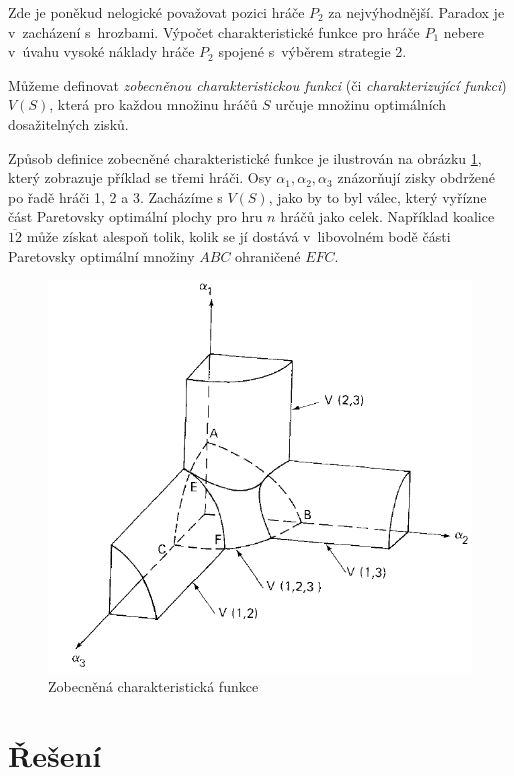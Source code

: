 \documentclass[a5paper,12pt]{article}
\begin{document}
    Zde je poněkud nelogické považovat pozici  hráče $P_2$ za nejvýhodnější. Paradox je v~zacházení s~hrozbami. Výpočet charakteristické funkce pro hráče $P_1$ nebere v~úvahu vysoké náklady hráče $P_2$ spojené s~výběrem strategie 2.

    Můžeme definovat \emph{zobecněnou charakteristickou funkci} (či \emph{charakterizující funkci}) $V(S)$, která pro každou množinu hráčů $S$ určuje množinu optimálních dosažitelných zisků.

    Způsob definice zobecněné charakteristické funkce je ilustrován na obrázku \ref{charfce}, který zobrazuje příklad se třemi hráči. Osy $\alpha_1,\alpha_2,\alpha_3$ znázorňují zisky obdržené po řadě hráči 1, 2 a 3. Zacházíme s $V(S)$, jako by to byl válec, který vyřízne část Paretovsky optimální plochy pro hru $n$ hráčů jako celek. Například koalice $\overline{12}$ může získat alespoň tolik, kolik se jí dostává v~libovolném bodě části Paretovsky optimální množiny $ABC$ ohraničené $EFC$.

    \begin{figure}[h!tb]
    \centering
    \includegraphics[scale=0.35]{1_6.png}
    \caption{Zobecněná charakteristická funkce \label{charfce}}
    \end{figure}
\clearpage    
  \section{Řešení}
\end{document}
